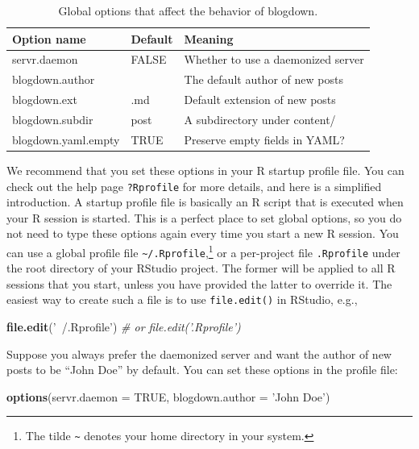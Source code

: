 \documentclass[12pt,]{krantz}
\makeatletter
\newenvironment{Shaded}{\begin{snugshade}}{\end{snugshade}}
\newcommand{\CommentTok}[1]{\textcolor[rgb]{0.56,0.35,0.01}{\textit{#1}}}
\newcommand{\DataTypeTok}[1]{\textcolor[rgb]{0.13,0.29,0.53}{#1}}
\newcommand{\KeywordTok}[1]{\textcolor[rgb]{0.13,0.29,0.53}{\textbf{#1}}}
\newcommand{\NormalTok}[1]{#1}
\newcommand{\OtherTok}[1]{\textcolor[rgb]{0.56,0.35,0.01}{#1}}
\newcommand{\StringTok}[1]{\textcolor[rgb]{0.31,0.60,0.02}{#1}}
\newenvironment{kframe}{%
\medskip{}
\setlength{\fboxsep}{.8em}
 \def\at@end@of@kframe{}%
 \ifinner\ifhmode%
  \def\at@end@of@kframe{\end{minipage}}%
  \begin{minipage}{\columnwidth}%
 \fi\fi%
 \def\FrameCommand##1{\hskip\@totalleftmargin \hskip-\fboxsep
 \colorbox{shadecolor}{##1}\hskip-\fboxsep
     \hskip-\linewidth \hskip-\@totalleftmargin \hskip\columnwidth}%
 \MakeFramed {\advance\hsize-\width
   \@totalleftmargin\z@ \linewidth\hsize
   \@setminipage}}%
 {\par\unskip\endMakeFramed%
 \at@end@of@kframe}
\renewenvironment{Shaded}{\begin{kframe}}{\end{kframe}}
\theoremstyle{definition}
\theoremstyle{definition}
\theoremstyle{definition}
\theoremstyle{remark}
\makeatother
\begin{document}
\begin{table}

\caption{\label{tab:global-options}Global options that affect the behavior of blogdown.}
\centering
\begin{tabular}[t]{lll}
\toprule
Option name & Default & Meaning\\
\midrule
servr.daemon & FALSE & Whether to use a daemonized server\\
blogdown.author &  & The default author of new posts\\
blogdown.ext & .md & Default extension of new posts\\
blogdown.subdir & post & A subdirectory under content/\\
blogdown.yaml.empty & TRUE & Preserve empty fields in YAML?\\
\bottomrule
\end{tabular}
\end{table}

We recommend that you set these options in your R startup profile file.
You can check out the help page \texttt{?Rprofile} for more details, and
here is a simplified introduction. A startup profile file is basically
an R script that is executed when your R session is started. This is a
perfect place to set global options, so you do not need to type these
options again every time you start a new R session. You can use a global
profile file \texttt{\textasciitilde{}/.Rprofile},\footnote{The tilde
  \texttt{\textasciitilde{}} denotes your home directory in your system.}
or a per-project file \texttt{.Rprofile} under the root directory of
your RStudio project. The former will be applied to all R sessions that
you start, unless you have provided the latter to override it. The
easiest way to create such a file is to use \texttt{file.edit()} in
RStudio, e.g.,

\begin{Shaded}
\begin{Highlighting}[]
\KeywordTok{file.edit}\NormalTok{(}\StringTok{'~/.Rprofile'}\NormalTok{)}
\CommentTok{# or file.edit('.Rprofile')}
\end{Highlighting}
\end{Shaded}

Suppose you always prefer the daemonized server and want the author of
new posts to be ``John Doe'' by default. You can set these options in
the profile file:

\begin{Shaded}
\begin{Highlighting}[]
\KeywordTok{options}\NormalTok{(}\DataTypeTok{servr.daemon =} \OtherTok{TRUE}\NormalTok{, }\DataTypeTok{blogdown.author =} \StringTok{'John Doe'}\NormalTok{)}
\end{Highlighting}
\end{Shaded}
\end{document}
